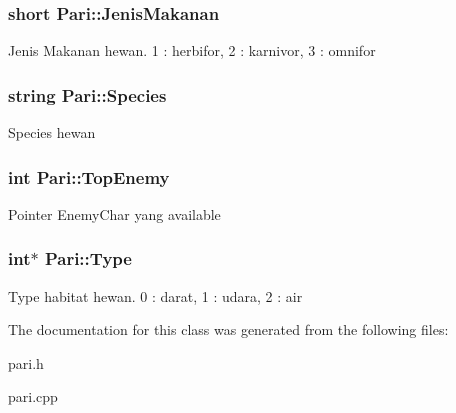 \subsubsection[{\texorpdfstring{Jenis\+Makanan}{JenisMakanan}}]{\setlength{\rightskip}{0pt plus 5cm}short Pari\+::\+Jenis\+Makanan\hspace{0.3cm}{\ttfamily [protected]}}\hypertarget{class_pari_a4360fe7222e68c47d0bc708e983c6390}{}\label{class_pari_a4360fe7222e68c47d0bc708e983c6390}
Jenis Makanan hewan. 1 \+: herbifor, 2 \+: karnivor, 3 \+: omnifor 
\subsubsection[{\texorpdfstring{Species}{Species}}]{\setlength{\rightskip}{0pt plus 5cm}string Pari\+::\+Species\hspace{0.3cm}{\ttfamily [protected]}}\hypertarget{class_pari_ae19b6c0ae58cbadd11f5cee76748c08a}{}\label{class_pari_ae19b6c0ae58cbadd11f5cee76748c08a}
Species hewan 
\subsubsection[{\texorpdfstring{Top\+Enemy}{TopEnemy}}]{\setlength{\rightskip}{0pt plus 5cm}int Pari\+::\+Top\+Enemy\hspace{0.3cm}{\ttfamily [protected]}}\hypertarget{class_pari_a21188e07ff07b057c3898feb81bc8c43}{}\label{class_pari_a21188e07ff07b057c3898feb81bc8c43}
Pointer Enemy\+Char yang available 
\subsubsection[{\texorpdfstring{Type}{Type}}]{\setlength{\rightskip}{0pt plus 5cm}int$\ast$ Pari\+::\+Type\hspace{0.3cm}{\ttfamily [protected]}}\hypertarget{class_pari_a32892923f010b6020f0ce6cb502bd40f}{}\label{class_pari_a32892923f010b6020f0ce6cb502bd40f}
Type habitat hewan. 0 \+: darat, 1 \+: udara, 2 \+: air 

The documentation for this class was generated from the following files\+:\begin{DoxyCompactItemize}
\item 
pari.\+h\item 
pari.\+cpp\end{DoxyCompactItemize}
